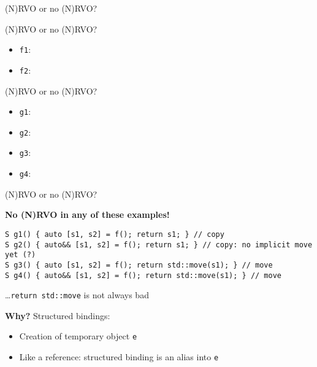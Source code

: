 \begin{frame}[fragile]{(N)RVO or no (N)RVO?}

\end{frame}

\begin{frame}[fragile]{(N)RVO or no (N)RVO?}
    \begin{itemize}
        \item \texttt{f1}: 
        \item \texttt{f2}: 
    \end{itemize}

\end{frame}

\begin{frame}[fragile]{(N)RVO or no (N)RVO?}
    \begin{itemize}
        \item \texttt{g1}: 
        \item \texttt{g2}: 
        \item \texttt{g3}: 
        \item \texttt{g4}: 
    \end{itemize}
\end{frame}

\begin{frame}[fragile]{(N)RVO or no (N)RVO?}
    \begin{center}
    \end{center}

    \textbf{No (N)RVO in any of these examples!}
    \begin{lstlisting}
S g1() { auto [s1, s2] = f(); return s1; } // copy
S g2() { auto&& [s1, s2] = f(); return s1; } // copy: no implicit move yet (?)
S g3() { auto [s1, s2] = f(); return std::move(s1); } // move
S g4() { auto&& [s1, s2] = f(); return std::move(s1); } // move
    \end{lstlisting}
    
    \hfill \ldots \texttt{return std::move} is not always bad

    \textbf{Why?} Structured bindings:
    \begin{itemize}
        \item Creation of temporary object \texttt{e}
        \item Like a reference: structured binding is an alias into \texttt{e}
    \end{itemize}
\end{frame}

